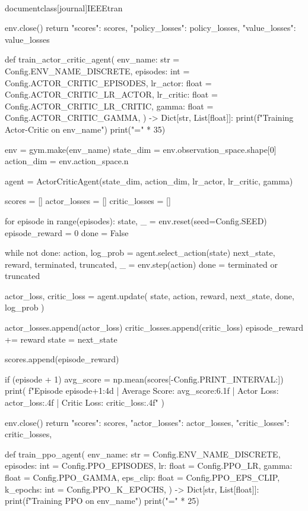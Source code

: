 \\documentclass[journal]{IEEEtran}
\begin{document}
    env.close()
    return {"scores": scores, "policy_losses": policy_losses, "value_losses": value_losses}

def train_actor_critic_agent(
    env_name: str = Config.ENV_NAME_DISCRETE,
    episodes: int = Config.ACTOR_CRITIC_EPISODES,
    lr_actor: float = Config.ACTOR_CRITIC_LR_ACTOR,
    lr_critic: float = Config.ACTOR_CRITIC_LR_CRITIC,
    gamma: float = Config.ACTOR_CRITIC_GAMMA,
) -> Dict[str, List[float]]:
    print(f"Training Actor-Critic on {env_name}")
    print("=" * 35)

    env = gym.make(env_name)
    state_dim = env.observation_space.shape[0]
    action_dim = env.action_space.n

    agent = ActorCriticAgent(state_dim, action_dim, lr_actor, lr_critic, gamma)

    scores = []
    actor_losses = []
    critic_losses = []

    for episode in range(episodes):
        state, _ = env.reset(seed=Config.SEED)
        episode_reward = 0
        done = False

        while not done:
            action, log_prob = agent.select_action(state)
            next_state, reward, terminated, truncated, _ = env.step(action)
            done = terminated or truncated

            actor_loss, critic_loss = agent.update(
                state, action, reward, next_state, done, log_prob
            )

            actor_losses.append(actor_loss)
            critic_losses.append(critic_loss)
            episode_reward += reward
            state = next_state

        scores.append(episode_reward)

        if (episode + 1) %
            avg_score = np.mean(scores[-Config.PRINT_INTERVAL:])
            print(
                f"Episode {episode+1:4d} | Average Score: {avg_score:6.1f} | Actor Loss: {actor_loss:.4f} | Critic Loss: {critic_loss:.4f}"
            )

    env.close()
    return {
        "scores": scores,
        "actor_losses": actor_losses,
        "critic_losses": critic_losses,
    }

def train_ppo_agent(
    env_name: str = Config.ENV_NAME_DISCRETE,
    episodes: int = Config.PPO_EPISODES,
    lr: float = Config.PPO_LR,
    gamma: float = Config.PPO_GAMMA,
    eps_clip: float = Config.PPO_EPS_CLIP,
    k_epochs: int = Config.PPO_K_EPOCHS,
) -> Dict[str, List[float]]:
    print(f"Training PPO on {env_name}")
    print("=" * 25)
\end{document}
